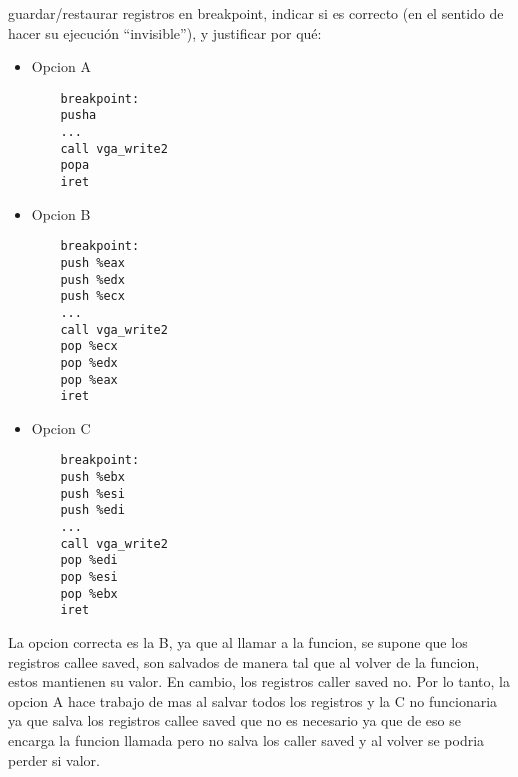 \documentclass[a4paper, 12pt]{article}
\begin{document}
\begin{itemize}
{				guardar/restaurar registros en breakpoint, indicar si es
				correcto (en el sentido de hacer su ejecución “invisible”), y
				justificar por qué:}
				\begin{itemize}
					\item Opcion A
\begin{lstlisting}
	breakpoint:
	pusha
	...
	call vga_write2
	popa
	iret
\end{lstlisting}
					\item Opcion B
\begin{lstlisting}
	breakpoint:
	push %eax
	push %edx
	push %ecx
	...
	call vga_write2
	pop %ecx
	pop %edx
	pop %eax
	iret
\end{lstlisting}
					\item Opcion C
\begin{lstlisting}
	breakpoint:
	push %ebx
	push %esi
	push %edi
	...
	call vga_write2
	pop %edi
	pop %esi
	pop %ebx
	iret
\end{lstlisting}
\end{itemize}
					La opcion correcta es la B, ya que al llamar a la funcion,
					se supone que los registros callee saved, son salvados de
					manera tal que al volver de la funcion, estos mantienen
					su valor. En cambio, los registros caller saved no. Por lo
					tanto, la opcion A hace trabajo de mas al salvar todos los
					registros y la C no funcionaria ya que salva los registros
					callee saved que no es necesario ya que de eso se encarga la
					funcion llamada pero no salva los caller saved y al volver
					se podria perder si valor.\\
			\end{itemize}
\end{document}
